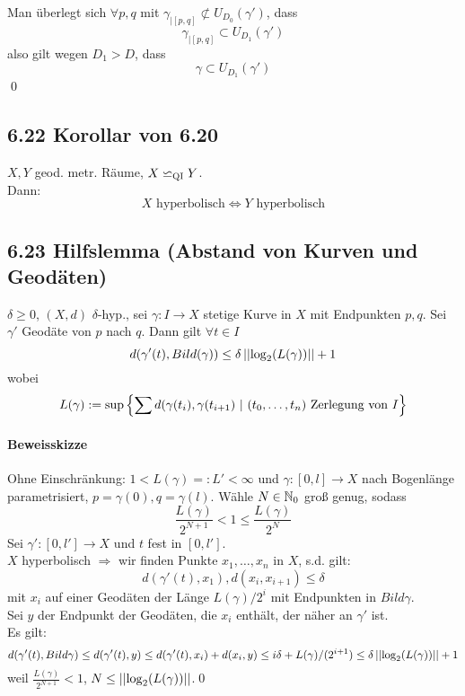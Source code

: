 \documentclass{article}
\newcommand{\qi}{\backsimeq_{\textsc{QI}}}
\begin{document}
Man überlegt sich $\forall p,q$ mit $\gamma_{|[p,q]} \not \subset U_{D_0}(\gamma')$, dass
\[\gamma_{|[p,q]} \subset U_{D_1} (\gamma')\]
also gilt wegen $D_1 > D$, dass
\[\gamma \subset U_{D_1}(\gamma') \]
\qed



\subsection{6.22 Korollar von 6.20}
$X,Y$ geod. metr. Räume, $X \qi Y$.\\
Dann:
\[X \text{ hyperbolisch} \Longleftrightarrow Y \text{ hyperbolisch} \]

\subsection{6.23 Hilfslemma (Abstand von Kurven und Geodäten)}
$\delta \geq 0$, $(X,d)$ $\delta$-hyp., sei $\gamma : I \rightarrow X$ stetige Kurve in $X$ mit Endpunkten $p,q$. Sei $\gamma'$ Geodäte von $p$ nach $q$. Dann gilt $\forall t\in I$
\[d(\gamma'(t), Bild(\gamma)) \leq \delta \left|\left|\log_2(L(\gamma))\right|\right| + 1 \]
wobei 
\[L(\gamma) := \sup \set{\sum d(\gamma(t_i), \gamma(t_{i+1})}{(t_0, \ldots, t_n) \text{ Zerlegung von } I} \]

\paragraph{Beweisskizze}
Ohne Einschränkung: $1 < L(\gamma) =: L' < \infty$ und $\gamma: [0,l] \rightarrow X$ nach Bogenlänge parametrisiert, $p = \gamma(0), q = \gamma(l)$. Wähle $N \in \mathbb{N}_0$ groß genug, sodass
\[\frac{L(\gamma)}{2^{N+1}} < 1 \leq \frac{L(\gamma)}{2^N} \]
Sei $\gamma' : [0, l'] \rightarrow X$ und $t$ fest in $[0, l']$.\\
$X$ hyperbolisch $\Longrightarrow$ wir finden Punkte $x_1, \ldots, x_n$ in $X$, s.d. gilt:
\[d(\gamma'(t), x_1 ) , d(x_i, x_{i+1}) \leq \delta \]
mit $x_i$ auf einer Geodäten der Länge $L(\gamma)/2^i$ mit Endpunkten in $Bild \gamma$.\\
Sei $y$ der Endpunkt der Geodäten, die $x_i$ enthält, der näher an $\gamma'$ ist.\\
Es gilt:
\[d(\gamma'(t) , Bild \gamma) \leq d(\gamma'(t), y) \leq d(\gamma'(t), x_i) + d(x_i,y) \leq i \delta + L(\gamma)/(2^{i+1}) \leq \delta \left|\left|\log_2(L(\gamma))\right|\right| + 1 \]
weil $\frac{L(\gamma)}{2^{N+1}} < 1$, $N \leq \left|\left|\log_2(L(\gamma))\right|\right|$.\qed

\end{document}
